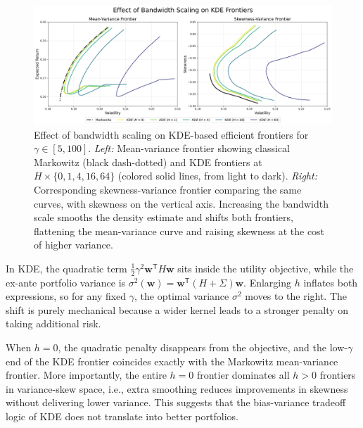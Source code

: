 \vspace{5mm}
\begin{figure}[H]
    \begin{center}
    \begin{minipage}{1\textwidth}
      \centering
      \includegraphics[width=\textwidth]{images/30_3.png}
    \end{minipage}
    \caption[Mean/Skewness-variance frontiers: KDE - Changing $H$]{Effect of bandwidth scaling on KDE-based efficient frontiers for $\gamma\in[5,100]$. \emph{Left:} Mean-variance frontier showing classical Markowitz (black dash-dotted) and KDE frontiers at $H\times\{0,1,4,16,64\}$ (colored solid lines, from light to dark). \emph{Right:} Corresponding skewness-variance frontier comparing the same curves, with skewness on the vertical axis. Increasing the bandwidth scale smooths the density estimate and shifts both frontiers, flattening the mean-variance curve and raising skewness at the cost of higher variance.}
    \label{fig:frontier3}
    \end{center}
    \end{figure}

In KDE, the quadratic term $\tfrac12\gamma^{2}\mathbf w^{\mathsf{T}}H\mathbf w$ sits inside the utility objective, while the ex-ante portfolio variance is $\sigma^{2}(\mathbf w)=\mathbf w^{\mathsf{T}}(H+\Sigma)\mathbf w$. Enlarging $h$ inflates both expressions, so for any fixed $\gamma$, the optimal variance $\sigma^{2}$ moves to the right. The shift is purely mechanical because a wider kernel leads to a stronger penalty on taking additional risk.

When $h=0$, the quadratic penalty disappears from the objective, and the low-$\gamma$ end of the KDE frontier coincides exactly with the Markowitz mean-variance frontier. More importantly, the entire $h=0$ frontier dominates all $h>0$ frontiers in variance-skew space, i.e., extra smoothing reduces improvements in skewness without delivering lower variance. This suggests that the bias-variance tradeoff logic of KDE does not translate into better portfolios.

